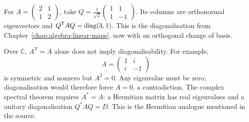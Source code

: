 \begin{example}
For $A=\begin{pmatrix}2&1\\1&2\end{pmatrix}$, take
$Q=\frac1{\sqrt2}\begin{pmatrix}1&1\\1&-1\end{pmatrix}$.
Its columns are orthonormal eigenvectors and
$Q^{\mathsf T}AQ=\operatorname{diag}(3,1)$.
This is the diagonalisation from Chapter~\ref{chap:algebra-linear-maps},
now with an orthogonal change of basis.
\end{example}

\begin{remark}
Over $\mathbb C$, $A^{\mathsf T}=A$ alone does not imply diagonalisability.
For example,
\[
 A=\begin{pmatrix}1&i\\i&-1\end{pmatrix}
\]
is symmetric and nonzero but $A^2=0$.
Any eigenvalue must be zero; diagonalisation would therefore force
$A=0$, a contradiction.
The complex spectral theorem requires $A^*=A$:
a Hermitian matrix has real eigenvalues and a unitary diagonalisation
$Q^*AQ=D$. This is the Hermitian analogue mentioned in the source.
\end{remark}
